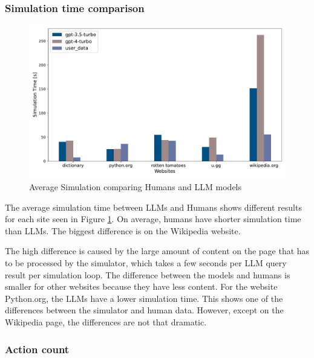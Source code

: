\subsubsection{Simulation time comparison}

\begin{figure}[ht]
    \centering
    \includegraphics[width=1\textwidth]{obrazky-figures/simulation_time_comparison.pdf}
    \caption{Average Simulation comparing Humans and LLM models}
    \label{time_comp}
\end{figure}

The average simulation time between LLMs and Humans shows different results for each site seen in Figure \ref{time_comp}. On average, humans have shorter simulation time than LLMs. The biggest difference is on the Wikipedia website.

The high difference is caused by the large amount of content on the page that has to be processed by the simulator, which takes a few seconds per LLM query result per simulation loop. The difference between the models and humans is smaller for other websites because they have less content. For the website Python.org, the LLMs have a lower simulation time. This shows one of the differences between the simulator and human data. However, except on the Wikipedia page, the differences are not that dramatic. 

\subsubsection{Action count}

